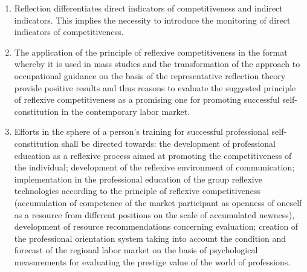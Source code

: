 \documentclass[conference]{IEEEtran}
\begin{document}
\begin{enumerate}
	\item Reflection differentiates direct indicators of competitiveness and indirect indicators. This implies the necessity to introduce the monitoring of direct indicators of competitiveness.
	\item The application of the principle of reflexive competitiveness in the format whereby it is used in mass studies and the transformation of the approach to occupational guidance on the basis of the representative reflection theory provide positive results and thus reasons to evaluate the suggested principle of reflexive competitiveness as a promising one for promoting successful self-constitution in the contemporary labor market.
	\item Efforts in the sphere of a person’s training for successful professional self-constitution shall be directed towards: the development of professional education as a reflexive process aimed at promoting the competitiveness of the individual; development of the reflexive environment of communication; implementation in the professional education of the group reflexive technologies according to the principle of reflexive competitiveness (accumulation of competence of the market participant as openness of oneself as a resource from different positions on the scale of accumulated newness), development of resource recommendations concerning evaluation; creation of the professional orientation system taking into account the condition and forecast of the regional labor market on the basis of psychological measurements for evaluating the prestige value of the world of professions.
\end{enumerate}


\end{document}
